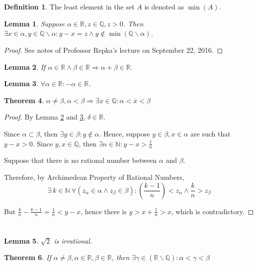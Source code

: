 \documentclass[12pt]{article}
\def\Re{\mathbb{R}}
\def\Q{\mathbb{Q}}
\def\ra{\Rightarrow}
\def\v{\\ \vspace{0.1in}}
\def\x{\overline{x}}
\def\ss{\subset}
\def\N{\mathbb{N}}
\newtheorem{theorem}{Theorem}[section]
\newtheorem{lemma}[theorem]{Lemma}
\theoremstyle{definition}
\newtheorem{definition}{Definition}[section]
\theoremstyle{remark}
\begin{document}
\section{}
\begin{definition}
The least element in the set $A$ is denoted as $\min(A)$.
\end{definition}

\begin{lemma}
  \label{lem:arch}
  Suppose $\alpha\in\Re,z\in\Q, z>0$. Then $\exists x\in\alpha, y\in\Q
  \backslash \alpha: y-x=z \wedge y \not\in \min(\Q\backslash \alpha)$.
\end{lemma}
\begin{proof}
See notes of Professor Repka's lecture on September 22, 2016.
\end{proof}
\begin{lemma}
  \label{sum}
  If $\alpha \in \Re \wedge \beta \in \Re \ra \alpha+\beta\in\Re.$
\end{lemma}
\begin{lemma}
  \label{neg}
  $\forall \alpha \in \Re: -\alpha \in \Re$.
\end{lemma}



\begin{theorem}
  \label{exra}
  $\alpha\neq\beta, \alpha < \beta \ra \exists x\in\Q: \alpha<\x<\beta$
\end{theorem}
\begin{proof}
  By Lemma \ref{sum} and \ref{neg}, $\delta\in\Re$. \v

  Since $\alpha\ss\beta$, then $\exists y\in\beta:
  y\not\in\alpha$. Hence, suppose $y\in\beta,x\in\alpha$ are such that
  $y-x>0$. Since $y,x\in\Q$, then $\exists n\in\N: y-x>\frac{1}{n}$\v

  Suppose that there is no rational number between $\alpha$ and $\beta$.\v

  Therefore, by Archimedean Property of Rational Numbers,
  \begin{equation}
    \exists\ k\in\N\ \forall (z_{\alpha}\in\alpha \wedge z_{\beta}\in\beta): (\frac{k-1}{n}) < z_{\alpha} \wedge \frac{k}{n} >
    z_{\beta}
  \end{equation}

  But $\frac{k}{n}-\frac{k-1}{n}=\frac{1}{n}<y-x$, hence there is
  $y>x+\frac{1}{n}>x$, which is contradictory.

\end{proof}

\section{}
\begin{lemma}
  \label{eqir}
$\sqrt{2}$ is irrational.
\end{lemma}
\begin{theorem}
If $\alpha\neq\beta, \alpha\in\Re, \beta\in\Re$, then $\exists \gamma\in(\Re\backslash\Q): \alpha<\gamma<\beta$
\end{theorem}
\end{document}
